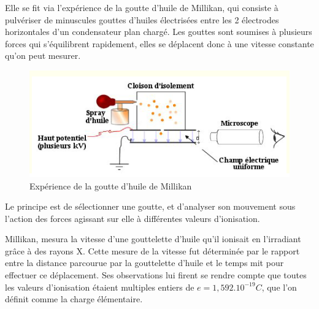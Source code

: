Elle se fit via l'expérience de la goutte d'huile de Millikan, qui consiste à pulvériser de minuscules gouttes d'huiles électrisées entre les 2 électrodes horizontales d'un condensateur plan chargé. Les gouttes sont soumises à plusieurs forces qui s'équilibrent rapidement, elles se déplacent donc à une vitesse constante qu'on peut mesurer.

\begin{figure}[ht]
\centering
\includegraphics[scale=0.60]{Images1/millikan.PNG}
\caption{Expérience de la goutte d'huile de Millikan}
\end{figure}

Le principe est de sélectionner une goutte, et  d'analyser son mouvement sous l'action des forces agissant sur elle  à différentes valeurs d'ionisation.

Millikan, mesura la vitesse d'une gouttelette d'huile qu'il ionisait en l'irradiant grâce à des rayons X. Cette mesure de la vitesse fut déterminée par le rapport entre la distance parcourue par la gouttelette d'huile et le temps mit pour effectuer ce déplacement. Ses observations lui firent se rendre compte que toutes les valeurs d'ionisation étaient multiples entiers de $e=1,592.10^{-19}C$, que l'on définit comme la charge élémentaire.


